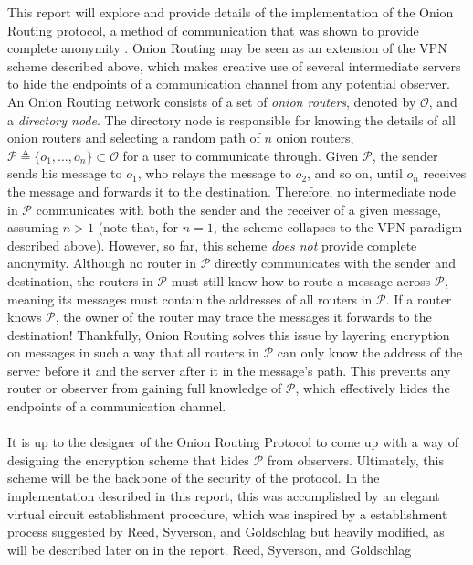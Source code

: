 \documentclass[10pt]{report}
\begin{document}
This report will explore and provide details of the implementation of the Onion Routing protocol, a
method of communication that was shown to provide complete anonymity \cite{FormalTreatment}. Onion
Routing may be seen as an extension of the VPN scheme described above, which makes creative use of
several intermediate servers to hide the endpoints of a communication channel from any potential
observer. An Onion Routing network consists of a set of \textit{onion routers}, denoted by
$\mathcal{O}$, and a \textit{directory node}. The directory node is responsible for knowing the
details of all onion routers and selecting a random path of $n$ onion routers,
$\mathcal{P}\triangleq\{o_1,\dots
,o_n\}\subset\mathcal{O}$ for a user to communicate through. Given $\mathcal{P}$, the sender sends
his message to $o_1$, who relays the message to $o_2$, and so on, until $o_n$ receives the message
and forwards it to the destination. Therefore, no intermediate node in $\mathcal{P}$ communicates
with both the sender and the receiver of a given message, assuming $n > 1$ (note that, for $n=1$,
the scheme collapses to the VPN paradigm described above). However, so far, this scheme \textit{does
not} provide complete anonymity. Although no router in $\mathcal{P}$ directly communicates with the
sender and destination, the routers in $\mathcal{P}$ must still know how to route a message across
$\mathcal{P}$, meaning its messages must contain the addresses of all routers in $\mathcal{P}$. If a
router knows $\mathcal{P}$, the owner of the router may trace the messages it
forwards to the destination! Thankfully, Onion Routing solves this issue by layering encryption on
messages in such a way that all routers in $\mathcal{P}$ can only know the address of the server
before it and the server after it in the message's path. This prevents any router or observer from
gaining full knowledge of $\mathcal{P}$, which effectively hides the endpoints of a communication
channel.\\\\
It is up to the designer of the Onion Routing Protocol to come up with a way of designing the
encryption scheme that hides $\mathcal{P}$ from observers. Ultimately, this scheme will be the
backbone of the security of the protocol. In the implementation described in this report, this was
accomplished by an elegant virtual circuit establishment procedure, which was inspired by a
establishment process suggested by Reed, Syverson, and Goldschlag \cite{OnionRoutingPatent} but
heavily modified, as will be described later on in the report. Reed, Syverson, and Goldschlag
\end{document}
